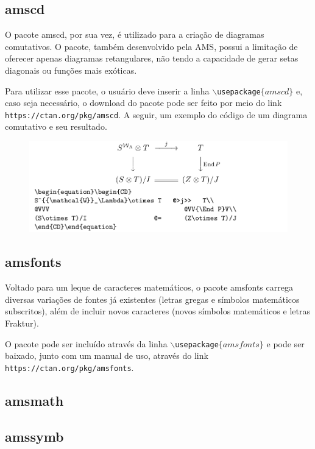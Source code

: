 \documentclass[12pt]{article}
\begin{document}
		\subsection{amscd}
			O pacote amscd, por sua vez, é utilizado para a criação de diagramas comutativos. O pacote, também desenvolvido pela AMS, possui a limitação de oferecer apenas diagramas retangulares, não tendo a capacidade de gerar setas diagonais ou funções mais exóticas.
			
			Para utilizar esse pacote, o usuário deve inserir a linha \texttt{$\backslash$usepackage$\{amscd\}$} e, caso seja necessário, o download do pacote pode ser feito por meio do link \texttt{https://ctan.org/pkg/amscd}. A seguir, um exemplo do código de um diagrama comutativo e seu resultado.
			
			\begin{figure}[h]
				\begin{center}
					\includegraphics[scale=0.4]{amscd.png}
				\end{center}
			\end{figure}
			
		
		\subsection{amsfonts}
			Voltado para um leque de caracteres matemáticos, o pacote amsfonts carrega diversas variações de fontes já existentes (letras gregas e símbolos matemáticos subscritos), além de incluir novos caracteres (novos símbolos matemáticos e letras Fraktur).
			
			O pacote pode ser incluído através da linha \texttt{$\backslash$usepackage$\{amsfonts\}$} e pode ser baixado, junto com um manual de uso, através do link \texttt{https://ctan.org/pkg/amsfonts}.
		
		\subsection{amsmath}
		
		
		\subsection{amssymb}
		
\end{document}
